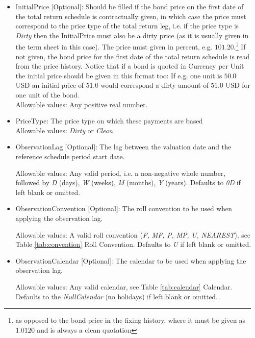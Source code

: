 \begin{itemize}
\begin{itemize}
  \item InitialPrice [Optional]: Should be filled if the bond price on the first date of the total return schedule is
    contractually given, in which case the price must correspond to the price type of the total return leg, i.e. if the
    price type is \emph{Dirty} then the InitialPrice must also be a dirty price (as it is usually given in the term
    sheet in this case). The price must given in percent, e.g. $101.20$.\footnote{as opposed to the bond price in the
    fixing history, where it must be given as $1.0120$ and is always a clean quotation} If not given, the bond price for
    the first date of the total return schedule is read from the price history.  Notice that if a bond is quoted in
    Currency per Unit the initial price should be given in this format too: If e.g. one unit is $50.0$ USD an initial
    price of $51.0$ would correspond a dirty amount of $51.0$ USD for one unit of the bond.\\

    Allowable values: Any positive real number.

  \item PriceType: The price type on which these payments are based\\
    Allowable values: \emph{Dirty} or \emph{Clean}

  \item ObservationLag [Optional]: The lag between the valuation date and the reference schedule period start date.

    Allowable values: Any valid period, i.e. a non-negative whole number, followed by \emph{D} (days), \emph{W} (weeks), \emph{M} (months), \emph{Y} (years). Defaults to \emph{0D} if left blank or omitted.

  \item ObservationConvention [Optional]: The roll convention to be used when applying the observation lag.

    Allowable values: A valid roll convention (\emph{F, MF, P, MP, U, NEAREST}), see Table \ref{tab:convention} Roll Convention. Defaults to \emph{U} if left blank or omitted.

  \item ObservationCalendar [Optional]: The calendar to be used when applying the observation lag.

      Allowable values: Any valid calendar, see Table \ref{tab:calendar} Calendar. Defaults to the \emph{NullCalendar} (no holidays) if left blank or omitted.


\end{itemize}
\end{itemize}
